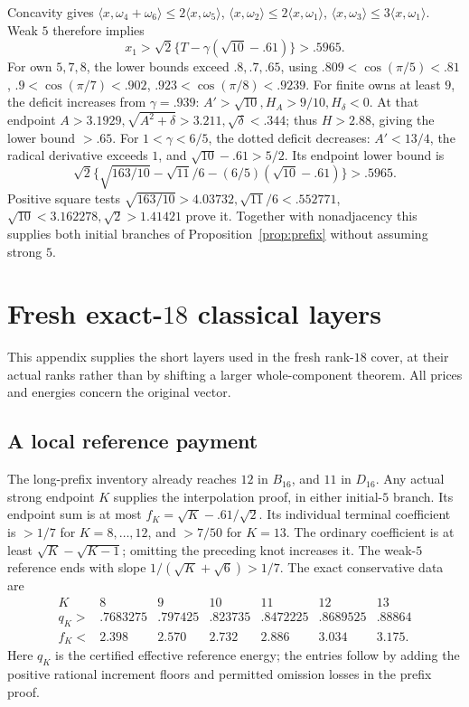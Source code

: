 \documentclass[11pt]{article}
\theoremstyle{definition}
\theoremstyle{remark}
\newcommand{\ip}[2]{\langle #1,#2\rangle}
\begin{document}
Concavity gives
\(\ip{x}{\omega_4+\omega_6}\leq2\ip{x}{\omega_5}\),
\(\ip{x}{\omega_2}\leq2\ip{x}{\omega_1}\),
\(\ip{x}{\omega_3}\leq3\ip{x}{\omega_1}\).
Weak \(5\) therefore implies
\[
 x_1>\sqrt2\{T-\gamma(\sqrt{10}-.61)\}>.5965.
\]
For own \(5,7,8\), the lower bounds exceed
\(.8,.7,.65\), using
\(.809<\cos(\pi/5)<.81\),
\(.9<\cos(\pi/7)<.902\),
\(.923<\cos(\pi/8)<.9239\).
For finite owns at least \(9\), the deficit increases
from \(\gamma=.939\):
\(A'>\sqrt{10},H_A>9/10,H_\delta<0\).
At that endpoint
\(A>3.1929,\sqrt{A^2+\delta}>3.211,\sqrt\delta<.344\);
thus \(H>2.88\), giving the lower bound \(>.65\).
For \(1<\gamma<6/5\), the dotted deficit decreases:
\(A'<13/4\), the radical derivative exceeds \(1\),
and \(\sqrt{10}-.61>5/2\).
Its endpoint lower bound is
\[
 \sqrt2\{\sqrt{163/10}-\sqrt{11}/6
                -(6/5)(\sqrt{10}-.61)\}>.5965.
\]
Positive square tests
\(\sqrt{163/10}>4.03732,\sqrt{11}/6<.552771\),
\(\sqrt{10}<3.162278,\sqrt2>1.41421\)
prove it. Together with nonadjacency this supplies
both initial branches of Proposition~\ref{prop:prefix}
without assuming strong \(5\).

\section{Fresh exact-\(18\) classical layers}
\label{app:exact18layers}
This appendix supplies the short layers used in the
fresh rank-\(18\) cover, at their actual ranks rather
than by shifting a larger whole-component theorem.
All prices and energies concern the original vector.

\subsection{A local reference payment}
The long-prefix inventory already reaches \(12\)
in \(B_{16}\), and \(11\) in \(D_{16}\).
Any actual strong endpoint \(K\) supplies the
interpolation proof, in either initial-\(5\) branch.
Its endpoint sum is at most
\(f_K=\sqrt K-.61/\sqrt2\).
Its individual terminal coefficient is \(>1/7\)
for \(K=8,\ldots,12\), and \(>7/50\) for \(K=13\).
The ordinary coefficient is at least
\(\sqrt K-\sqrt{K-1}\); omitting the preceding
knot increases it. The weak-\(5\) reference
ends with slope \(1/(\sqrt K+\sqrt6)>1/7\).
The exact conservative data are
\[
\begin{array}{c|rrrrrr}
K&8&9&10&11&12&13\\ \hline
q_K>&.7683275&.797425&.823735&.8472225&.8689525&.88864\\
f_K<&2.398&2.570&2.732&2.886&3.034&3.175.
\end{array}
\]
Here \(q_K\) is the certified effective reference
energy; the entries follow by adding the positive
rational increment floors and permitted omission
losses in the prefix proof.
\end{document}
